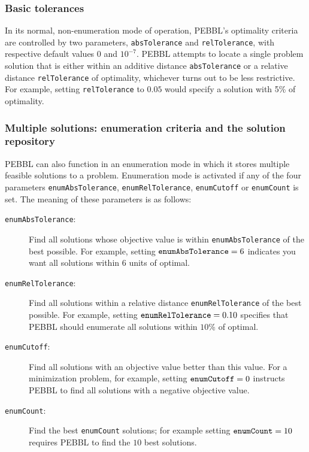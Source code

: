 \subsubsection{Basic tolerances}

In its normal, non-enumeration 
mode of operation, PEBBL's optimality criteria are
controlled by two parameters, \texttt{absTolerance} and
\texttt{relTolerance}, with respective default values $0$ and
$10^{-7}$. PEBBL attempts to locate a single problem solution that is
either within an additive distance \texttt{absTolerance} or a relative
distance \texttt{relTolerance} of optimality, whichever turns out to
be less restrictive.  For example, setting \texttt{relTolerance} to
$0.05$ would specify a solution with 5\% of optimality.


\subsubsection{Multiple solutions: enumeration criteria
  and the solution repository}

PEBBL can also function in an enumeration mode in which it stores
multiple feasible solutions to a problem.  Enumeration mode is
activated if any of the four parameters \texttt{enumAbsTolerance},
\texttt{enumRelTolerance}, \texttt{enumCutoff} or
\texttt{enumCount} is set.  The meaning of these parameters is as
follows:
\begin{description}
\item[\texttt{enumAbsTolerance}:] Find all solutions whose objective
  value is within \texttt{enumAbsTolerance} of the best possible.  For
  example, setting $\text{\texttt{enumAbsTolerance}}=6$ indicates you
  want all solutions within $6$ units of optimal.
\item[\texttt{enumRelTolerance}:]  Find all solutions within a
  relative distance \texttt{enumRelTolerance} of the best possible.
  For example, setting $\text{\texttt{enumRelTolerance}}=0.10$ specifies
  that PEBBL should enumerate all solutions within $10$\% of optimal. 
\item[\texttt{enumCutoff}:]  Find all solutions with an objective
  value better than this value.  For a minimization problem, for
  example, setting $\text{\texttt{enumCutoff}}=0$ instructs PEBBL to
  find all solutions with a negative objective value.
\item[\texttt{enumCount}:]  Find the best \texttt{enumCount}
  solutions; for example setting $\text{\texttt{enumCount}}=10$
  requires PEBBL to find the $10$ best solutions.
\end{description}

